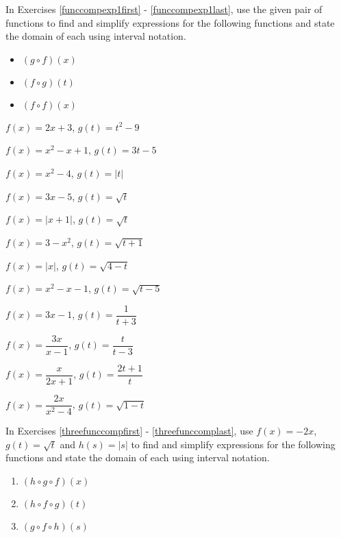 In Exercises \ref{funccompexp1first} - \ref{funccompexp1last}, use the given pair of functions to find and simplify expressions for the following functions and state the domain of each using interval notation.

\begin{multicols}{3}

\begin{itemize}

\item  $(g \circ f)(x)$

\item  $(f \circ g)(t)$

\item  $(f \circ f)(x)$


\end{itemize}

\end{multicols}


\begin{shortexenum}
\item  $f(x) = 2x+3$, $g(t) = t^2-9$ \label{funccompexp1first}
\item  $f(x) = x^2 -x+1$, $g(t) = 3t-5$ 
\item  $f(x) = x^2-4$, $g(t) = |t|$
\item  $f(x) = 3x-5$, $g(t) = \sqrt{t}$ 
\item  $f(x) = |x+1|$, $g(t) = \sqrt{t}$
\item  $f(x) = 3-x^2$, $g(t) = \sqrt{t+1}$ 
\item  $f(x) = |x|$, $g(t) = \sqrt{4-t}$
\item  $f(x) = x^2-x-1$, $g(t) = \sqrt{t-5}$ 
\item  $f(x) = 3x-1$, $g(t) = \dfrac{1}{t+3}$
\item  $f(x) = \dfrac{3x}{x-1}$, $g(t) =\dfrac{t}{t-3}$
\item  $f(x) = \dfrac{x}{2x+1}$, $g(t) = \dfrac{2t+1}{t}$
\item  $f(x) =  \dfrac{2x}{x^2-4}$, $g(t) =\sqrt{1-t}$ 
\label{funccompexp1last}
\end{shortexenum}

In Exercises \ref{threefunccompfirst} - \ref{threefunccomplast}, use $f(x) = -2x$, $g(t) = \sqrt{t}$ and $h(s) = |s|$ to find and simplify expressions for the following functions and state the domain of each using interval notation.

\begin{multicols}{3}

\begin{enumerate}
\setcounter{enumi}{\value{HW}}

\item $(h\circ g \circ f)(x)$ \label{threefunccompfirst}

\item $(h\circ f \circ g)(t)$

\item $(g\circ f \circ h)(s)$

\setcounter{HW}{\value{enumi}}
\end{enumerate}
\end{multicols}

